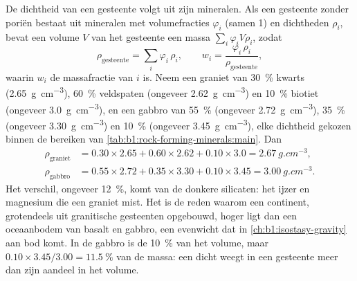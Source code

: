 De dichtheid van een gesteente volgt uit zijn mineralen. Als een gesteente zonder poriën bestaat uit mineralen met volumefracties $\varphi_i$
(samen 1) en dichtheden $\rho_i$, bevat een volume $V$ van het gesteente een massa
$\sum_i \varphi_i V \rho_i$, zodat
\[
  \rho_{\text{gesteente}} = \sum_i \varphi_i\,\rho_i ,
  \qquad
  w_i = \frac{\varphi_i\,\rho_i}{\rho_{\text{gesteente}}},
\]
waarin $w_i$ de massafractie van  $i$ is. Neem een graniet van \qty{30}{\percent} kwarts (\qty{2.65}{g.cm^{-3}}),
\qty{60}{\percent} veldspaten (ongeveer \qty{2.62}{g.cm^{-3}}) en \qty{10}{\percent} biotiet (ongeveer \qty{3.0}{g.cm^{-3}}), en
een gabbro van \qty{55}{\percent}  (ongeveer \qty{2.72}{g.cm^{-3}}), \qty{35}{\percent}  (ongeveer
\qty{3.30}{g.cm^{-3}}) en \qty{10}{\percent}  (ongeveer \qty{3.45}{g.cm^{-3}}), elke dichtheid gekozen binnen de bereiken van
\cref{tab:b1:rock-forming-minerals:main}. Dan
\begin{align*}
  \rho_{\text{graniet}} &= 0.30\times2.65 + 0.60\times2.62 + 0.10\times3.0
  = \qty{2.67}{g.cm^{-3}},\\
  \rho_{\text{gabbro}} &= 0.55\times2.72 + 0.35\times3.30 + 0.10\times3.45
  = \qty{3.00}{g.cm^{-3}}.
\end{align*}
Het verschil, ongeveer \qty{12}{\percent}, komt van de donkere silicaten: het ijzer en magnesium die een graniet mist. Het is de reden
waarom een continent, grotendeels uit granitische gesteenten opgebouwd, hoger ligt dan een oceaanbodem van basalt en gabbro, een
evenwicht dat in \cref{ch:b1:isostasy-gravity} aan bod komt. In de gabbro is de  \qty{10}{\percent} van het volume, maar
$0.10\times3.45/3.00 = \qty{11.5}{\percent}$ van de massa: een dicht  weegt in een gesteente meer dan zijn aandeel in het volume.

